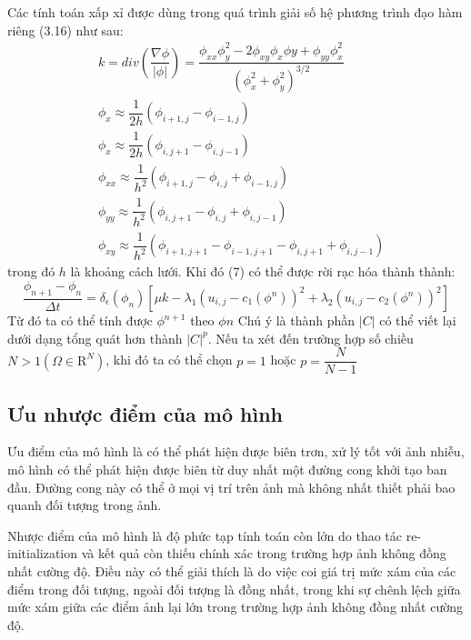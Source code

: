 \documentclass[12pt,oneside,a4]{report}
\begin{document}
Các tính toán xấp xỉ được dùng trong quá trình giải số hệ phương trình đạo hàm riêng (3.16) như sau:
\begin{equation}
\begin{split}
&k=div(\dfrac{\nabla \phi}{|\phi|})=\dfrac{\phi_{xx}\phi^2_{y}-2\phi_{xy}\phi_{x}\phi{y}+\phi_{yy}\phi^2_{x}}{(\phi^2_x+\phi^2_y)^{3/2}}\\
&\phi_x\approx \dfrac{1}{2h}(\phi_{i+1,j}-\phi_{i-1,j}) \\ 
&\phi_x\approx \dfrac{1}{2h}(\phi_{i,j+1}-\phi_{i,j-1}) \\
&\phi_{xx}\approx \dfrac{1}{h^2}(\phi_{i+1,j}-\phi_{i,j}+\phi_{i-1,j}) \\
&\phi_{yy}\approx \dfrac{1}{h^2}(\phi_{i,j+1}-\phi_{i,j}+\phi_{i,j-1}) \\
&\phi_{xy}\approx \dfrac{1}{h^2}(\phi_{i+1,j+1}-\phi_{i-1,j+1}-\phi_{i,j+1}+\phi_{i,j-1}) 
\end{split}
\end{equation}
trong đó $h$ là khoảng cách lưới. Khi đó (7) có thể được rời rạc hóa thành thành: 
\begin{equation}
\dfrac{\phi_{n+1}-\phi_{n}}{\Delta t}=\delta_{\epsilon}(\phi_{n})[\mu k-\lambda_1 (u_{i,j}-c_1(\phi^{n}))^2+\lambda_2 (u_{i,j}-c_2(\phi^{n}))^2]
\end{equation}
Từ đó ta có thể tính được $\phi^{n+1}$ theo $\phi{n}$
Chú ý là thành phần $|C|$ có thể viết lại dưới dạng tổng quát hơn thành $|C|^p$. Nếu ta xét đến trường hợp số chiều $N>1(\Omega \in \mathrm{R}^N )$, khi đó ta có thể chọn $p=1$ hoặc $p=\dfrac{N}{N-1}$
\subsection{Ưu nhược điểm của mô hình}
\hspace{0.5cm}Ưu điểm của mô hình là có thể phát hiện được biên trơn, xử lý tốt với ảnh nhiễu, mô hình có thể phát hiện được biên từ duy nhất một đường cong khởi tạo ban đầu. Đường cong này có thể ở mọi vị trí trên ảnh mà không nhất thiết phải bao quanh đối tượng trong ảnh.

Nhược điểm của mô hình  là độ phức tạp tính toán còn lớn do thao tác re-initialization và kết quả còn thiếu chính xác trong trường hợp ảnh không đồng nhất cường độ. Điều này có thể giải thích là do việc coi giá trị mức xám của các điểm trong đối tượng, ngoài đối tượng là đồng nhất, trong khi sự chênh lệch giữa mức xám giữa các điểm ảnh lại lớn trong trường hợp ảnh không đồng nhất cường độ.
\end{document}
